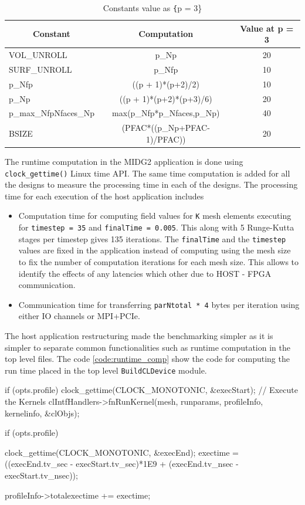 \begin{table}[ht]
    \centering
    \caption{Constants value as \texttt\{p = 3\}}
    \label{tab:constants}
    \begin{tabular}{lcc}
    \multicolumn{1}{c}{\textbf{Constant}} & \multicolumn{1}{c}{\textbf{Computation}} & \multicolumn{1}{c}{\textbf{Value at p = 3}} \\
    \hline
    VOL\_UNROLL & p\_Np & 20 \\
    SURF\_UNROLL & p\_Nfp & 10\\
    p\_Nfp & ((p + 1)*(p+2)/2) & 10 \\
    p\_Np & ((p + 1)*(p+2)*(p+3)/6) & 20 \\
    p\_max\_NfpNfaces\_Np & max(p\_Nfp*p\_Nfaces,p\_Np) & 40 \\
    BSIZE & (PFAC*((p\_Np+PFAC-1)/PFAC)) & 20 \\
    \hline
    \end{tabular}%
\end{table}

The runtime computation in the MIDG2 application is done using \texttt{clock\_gettime()}
Linux time API. The same time computation is added for all the designs to
measure the processing time in each of the designs. The processing time
for each execution of the host application includes
\begin{itemize}
\item Computation time for computing field values for \texttt{K} mesh elements
executing for \texttt{timestep = 35} and \texttt{finalTime = 0.005}. This along
with 5 Runge-Kutta stages per timestep gives 135 iterations. The \texttt{finalTime}
and the \texttt{timestep} values are fixed in the application instead of
computing using the mesh size to fix the number of computation iterations for each
mesh size. This allows to identify the effects of any latencies which other
due to HOST - FPGA communication.
\item Communication time for transferring \texttt{parNtotal * 4} bytes per iteration
using either IO channels or MPI+PCIe.
\end{itemize}

The host application restructuring made the benchmarking simpler as it is
simpler to separate common functionalities such as runtime computation
in the top level files. The code \ref{code:runtime_comp} show the code
for computing the run time placed in the top level \texttt{BuildCLDevice}
module.
\begin{CppCode}[caption=Runtime computation code for the MIDG2 Designs
    using \texttt{clock\_gettime()}, frame=tlrb, label=code:runtime_comp]
if (opts.profile)
{
    clock_gettime(CLOCK_MONOTONIC, &execStart);
}
// Execute the Kernels
clIntfHandlers->fnRunKernel(mesh, runparams, profileInfo, kernelinfo, &clObjs);

if (opts.profile)
{
    clock_gettime(CLOCK_MONOTONIC, &execEnd);
    exectime = ((execEnd.tv_sec - execStart.tv_sec)*1E9
            + (execEnd.tv_nsec - execStart.tv_nsec));

    profileInfo->totalexectime += exectime;
}
\end{CppCode}

